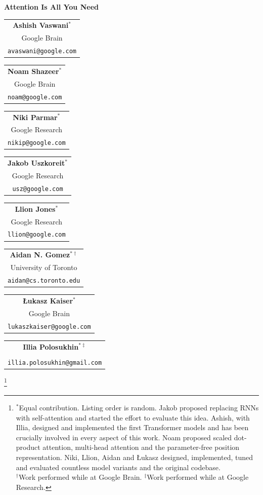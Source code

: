 \documentclass[10pt,letterpaper]{article}
\newcommand\blfootnote[1]{%
  \begingroup
  \renewcommand\thefootnote{}\footnote{#1}%
  \addtocounter{footnote}{-1}%
  \endgroup
}
\begin{document}
\begin{center}
  {\LARGE\bfseries Attention Is All You Need\par}
  \vspace{1.4em}

  \newcommand{\authblk}[3]{%
    \begin{tabular}[t]{@{}c@{}}\textbf{#1}\\[1pt] #2\\[1pt]{\small\texttt{#3}}\end{tabular}}
  \authblk{Ashish Vaswani$^{*}$}{Google Brain}{avaswani@google.com}\hspace{1.1em}%
  \authblk{Noam Shazeer$^{*}$}{Google Brain}{noam@google.com}\hspace{1.1em}%
  \authblk{Niki Parmar$^{*}$}{Google Research}{nikip@google.com}\hspace{1.1em}%
  \authblk{Jakob Uszkoreit$^{*}$}{Google Research}{usz@google.com}

  \vspace{1.1em}
  \authblk{Llion Jones$^{*}$}{Google Research}{llion@google.com}\hspace{1.1em}%
  \authblk{Aidan N. Gomez$^{*\dagger}$}{University of Toronto}{aidan@cs.toronto.edu}\hspace{1.1em}%
  \authblk{Łukasz Kaiser$^{*}$}{Google Brain}{lukaszkaiser@google.com}\hspace{1.1em}%
  \authblk{Illia Polosukhin$^{*\ddagger}$}{}{illia.polosukhin@gmail.com}
\end{center}

\blfootnote{$^{*}$Equal contribution. Listing order is random. Jakob proposed
replacing RNNs with self-attention and started the effort to evaluate this idea.
Ashish, with Illia, designed and implemented the first Transformer models and
has been crucially involved in every aspect of this work. Noam proposed
scaled dot-product attention, multi-head attention and the parameter-free
position representation. Niki, Llion, Aidan and Łukasz designed, implemented,
tuned and evaluated countless model variants and the original codebase.\\
$^{\dagger}$Work performed while at Google Brain.\quad
$^{\ddagger}$Work performed while at Google Research.}
\end{document}

